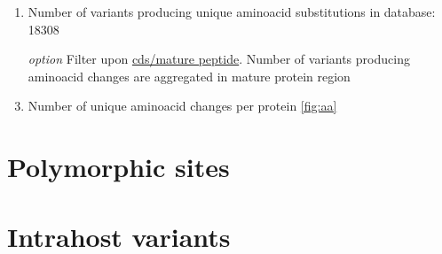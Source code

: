 \documentclass[a4paper, 10pt]{article}        %
\begin{document}
\begin{enumerate}
\begin{itemize}
\end{itemize}
\item Number of variants producing unique aminoacid substitutions in database: 18308
\item[\textsl{option}] Filter upon \underline{cds/mature peptide}. Number of variants producing aminoacid changes are aggregated in mature protein region
\item Number of unique aminoacid changes per protein \ref{fig:aa}
\end{enumerate}

     
       

\section{Polymorphic sites}

\section{Intrahost variants}
\end{document}
